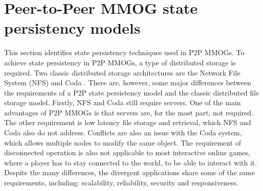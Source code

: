 \documentclass[10pt,a4paper,journal,cspaper,compsoc]{IEEEtran}
\begin{document}
%

\section{Peer-to-Peer MMOG state persistency models}
\label{p2p_mmog_state_persistency}

This section identifies state persistency techniques used in P2P MMOGs. To achieve state persistency in P2P MMOGs, a type of distributed storage is
required. Two classic distributed storage architectures are the Network File System (NFS) \cite{NFS4_protocol} and Coda
\cite{Kistler_Coda_disconnected}. There are, however, some major differences between the requirements of a P2P state persistency model and the
classic distributed file storage model. Firstly, NFS and Coda still require servers. One of the main advantages of P2P MMOGs is that servers are, for
the most part, not required. The other requirement is low latency file storage and retrieval, which NFS and Coda also do not address. Conflicts are
also an issue with the Coda system, which allows multiple nodes to modify the same object. The requirement of disconnected operation is also not
applicable to most interactive online games, where a player has to stay connected to the world, to be able to interact with it. Despite the many
differences, the divergent applications share some of the same requirements, including: scalability, reliability, security and responsiveness.
\end{document}
